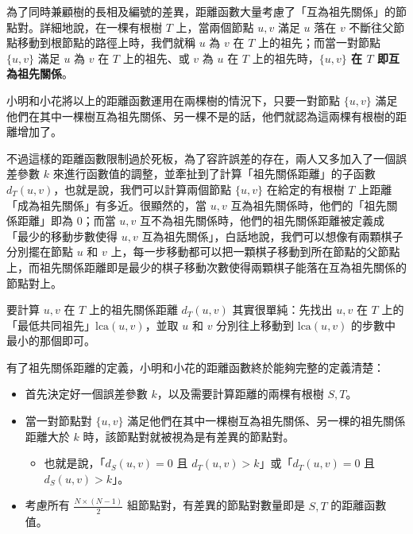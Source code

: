 為了同時兼顧樹的長相及編號的差異，距離函數大量考慮了「互為祖先關係」的節點對。詳細地說，在一棵有根樹
\(T\) 上，當兩個節點 \(u, v\) 滿足 \(u\) 落在 \(v\)
不斷往父節點移動到根節點的路徑上時，我們就稱 \(u\) 為 \(v\) 在 \(T\)
上的祖先；而當一對節點 \(\{u, v\}\) 滿足 \(u\) 為 \(v\) 在 \(T\)
上的祖先、或 \(v\) 為 \(u\) 在 \(T\) 上的祖先時，\textbf{\(\{u, v\}\) 在
\(T\) 即互為祖先關係}。

小明和小花將以上的距離函數運用在兩棵樹的情況下，只要一對節點
\(\{u, v\}\)
滿足他們在其中一棵樹互為祖先關係、另一棵不是的話，他們就認為這兩棵有根樹的距離增加了。

不過這樣的距離函數限制過於死板，為了容許誤差的存在，兩人又多加入了一個誤差參數
\(k\) 來進行函數值的調整，並牽扯到了計算「祖先關係距離」的子函數
\(d_T(u, v)\)，也就是說，我們可以計算兩個節點 \(\{u, v\}\)
在給定的有根樹 \(T\) 上距離「成為祖先關係」有多近。很顯然的，當 \(u, v\)
互為祖先關係時，他們的「祖先關係距離」即為 \(0\)；而當 \(u, v\)
互不為祖先關係時，他們的祖先關係距離被定義成「最少的移動步數使得
\(u, v\) 互為祖先關係」，白話地說，我們可以想像有兩顆棋子分別擺在節點
\(u\) 和 \(v\)
上，每一步移動都可以把一顆棋子移動到所在節點的父節點上，而祖先關係距離即是最少的棋子移動次數使得兩顆棋子能落在互為祖先關係的節點對上。

要計算 \(u, v\) 在 \(T\) 上的祖先關係距離 \(d_T(u, v)\)
其實很單純：先找出 \(u, v\) 在 \(T\)
上的「最低共同祖先」\(\textrm{lca}(u, v)\)，並取 \(u\) 和 \(v\)
分別往上移動到 \(\textrm{lca}(u, v)\) 的步數中最小的那個即可。

有了祖先關係距離的定義，小明和小花的距離函數終於能夠完整的定義清楚：

\begin{itemize}
\tightlist
\item
  首先決定好一個誤差參數 \(k\)，以及需要計算距離的兩棵有根樹 \(S, T\)。
\item
  當一對節點對 \(\{u, v\}\)
  滿足他們在其中一棵樹互為祖先關係、另一棵的祖先關係距離大於 \(k\)
  時，該節點對就被視為是有差異的節點對。

  \begin{itemize}
  \tightlist
  \item
    也就是說，「\(d_S(u, v) = 0\) 且
    \(d_T(u, v)>k\)」或「\(d_T(u, v) = 0\) 且 \(d_S(u, v) > k\)」。
  \end{itemize}
\item
  考慮所有 \(\frac{N\times (N - 1)}{2}\)
  組節點對，有差異的節點對數量即是 \(S, T\) 的距離函數值。
\end{itemize}

\newpage

